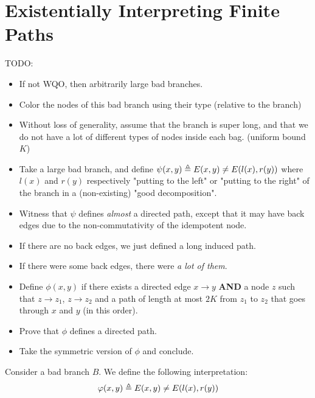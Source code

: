 \section{Existentially Interpreting Finite Paths}
\label{sec:interpreting-paths}

TODO:
\begin{itemize}
    \item If not WQO, then arbitrarily large bad branches.
    \item Color the nodes of this bad branch using their type (relative to the branch)
    \item Without loss of generality, assume that the branch is super long, and that
        we do not have a lot of different types of nodes inside each bag.
        (uniform bound $K$)
    \item Take a large bad branch, and define 
        $\psi(x,y) \triangleq E(x,y) \neq E(l(x), r(y))$ where
        $l(x)$ and $r(y)$ respectively "putting to the left" or 
        "putting to the right" of the branch in a (non-existing) "good decomposition".
    \item Witness that $\psi$ defines \emph{almost} a directed path, except
        that it may have back edges due to the non-commutativity of the idempotent node.
    \item If there are no back edges, we just defined a long induced path.
    \item If there were some back edges, there were \emph{a lot of them}.
    \item Define $\phi(x,y)$ if there exists a directed edge $x \to y$
        \textbf{AND} a node $z$ such that $z \to z_1$, $z \to z_2$
        and a path of length at most $2K$ from $z_1$  to $z_2$
        that goes through $x$ and $y$ (in this order).
    \item Prove that $\phi$ defines a directed path.
    \item Take the symmetric version of $\phi$ and conclude.
\end{itemize}


Consider a bad branch $B$. We define the following interpretation:
\begin{equation*}
    \varphi(x,y) \triangleq 
    E(x,y) \neq E(l(x), r(y))
\end{equation*}

